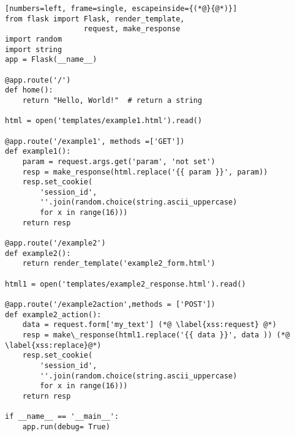\begin{lstlisting}[numbers=left, frame=single, escapeinside={(*@}{@*)}]
from flask import Flask, render_template,
                  request, make_response
import random
import string
app = Flask(__name__)

@app.route('/')
def home():
    return "Hello, World!"  # return a string

html = open('templates/example1.html').read()

@app.route('/example1', methods =['GET'])
def example1():
    param = request.args.get('param', 'not set')
    resp = make_response(html.replace('{{ param }}', param))
    resp.set_cookie(
        'session_id',
        ''.join(random.choice(string.ascii_uppercase)
        for x in range(16)))
    return resp

@app.route('/example2')
def example2():
    return render_template('example2_form.html')

html1 = open('templates/example2_response.html').read()

@app.route('/example2action',methods = ['POST'])
def example2_action():
    data = request.form['my_text'] (*@ \label{xss:request} @*)
    resp = make\_response(html1.replace('{{ data }}', data )) (*@ \label{xss:replace}@*)
    resp.set_cookie(
        'session_id',
        ''.join(random.choice(string.ascii_uppercase)
        for x in range(16)))
    return resp

if __name__ == '__main__':
    app.run(debug= True)
\end{lstlisting}
